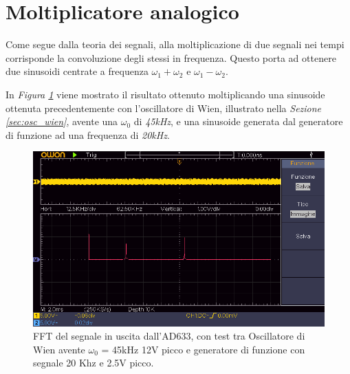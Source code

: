 \documentclass[titlepage]{report}
\begin{document}
	
	
		
\newpage
\section{Moltiplicatore analogico}
	\label{sec:analog_multiplier}
	Come segue dalla teoria dei segnali, alla moltiplicazione di due segnali nei tempi corrisponde la convoluzione degli stessi in frequenza. Questo porta ad ottenere due sinusoidi centrate a frequenza $\omega_1 + \omega_2$ e $\omega_1 - \omega_2$.
	
	\noindent In \textit{Figura \ref{fig:FFTmixer}} viene mostrato il risultato ottenuto moltiplicando una sinusoide ottenuta precedentemente con l'oscillatore di Wien, illustrato nella \textit{Sezione \ref{sec:osc_wien}}, avente una $\omega_0$ di \textit{45kHz}, e una sinusoide generata dal generatore di funzione ad una frequenza di \textit{20kHz}.

	\begin{figure}[H]
		\centering
		\includegraphics[scale=0.9]{Immagini/uscita_ad633_con_fcngen_20k_e_osc_45k.png}
		\caption{FFT del segnale in uscita dall'AD633, con test tra Oscillatore di Wien avente $\omega_0$ = 45kHz 12V picco e generatore di funzione con segnale 20 Khz e 2.5V picco.}
		\label{fig:FFTmixer}
	\end{figure}
	
\end{document}
